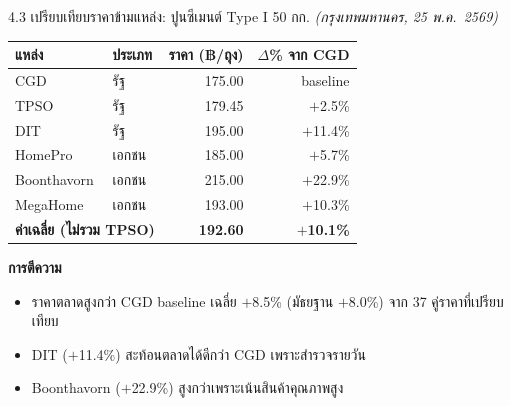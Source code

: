 \documentclass[aspectratio=169,11pt]{beamer}
\begin{document}
\begin{frame}{4.3 เปรียบเทียบราคาข้ามแหล่ง: ปูนซีเมนต์ Type I 50 กก.}
  \scriptsize
  \textit{(กรุงเทพมหานคร, 25 พ.ค.~2569)}
  \begin{table}
    \centering
    \begin{tabularx}{\textwidth}{l X r r}
      \toprule
      \textbf{แหล่ง} & \textbf{ประเภท} & \textbf{ราคา (฿/ถุง)} & \textbf{$\Delta$\% จาก CGD} \\
      \midrule
      CGD          & รัฐ          & 175.00 & baseline \\
      TPSO         & รัฐ          & 179.45 & $+$2.5\% \\
      DIT          & รัฐ          & 195.00 & $+$11.4\% \\
      HomePro      & เอกชน        & 185.00 & $+$5.7\% \\
      Boonthavorn  & เอกชน        & 215.00 & $+$22.9\% \\
      MegaHome     & เอกชน        & 193.00 & $+$10.3\% \\
      \midrule
      \multicolumn{2}{l}{\textbf{ค่าเฉลี่ย (ไม่รวม TPSO)}} & \textbf{192.60} & \textbf{$+$10.1\%} \\
      \bottomrule
    \end{tabularx}
  \end{table}
  \textbf{การตีความ}
  \begin{itemize}
    \item ราคาตลาดสูงกว่า CGD baseline เฉลี่ย $+$8.5\% (มัธยฐาน $+$8.0\%)
          จาก 37 คู่ราคาที่เปรียบเทียบ
    \item DIT ($+$11.4\%) สะท้อนตลาดได้ดีกว่า CGD เพราะสำรวจรายวัน
    \item Boonthavorn ($+$22.9\%) สูงกว่าเพราะเน้นสินค้าคุณภาพสูง
  \end{itemize}
\end{frame}
\end{document}
